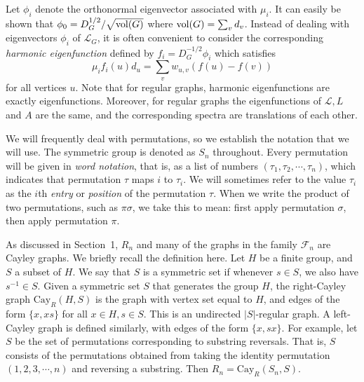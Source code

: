Let $\phi_i$ denote the orthonormal eigenvector associated with $\mu_i$.  It can easily be shown that
$\phi_0 = D_G^{1/2}/\sqrt{{\rm vol}(G)}$ where ${\rm vol}(G)=\sum_v d_v$.
Instead of dealing with eigenvectors $\phi_i$ of $\mathcal{L}_G$, it is often convenient to consider
the corresponding
\textit{harmonic eigenfunction} defined by $f_i = D_G^{-1/2} \phi_i$ which satisfies
\[  \mu_i f_i(u)d_u= \sum_{v} w_{u,v} (f(u)-f(v))  \]
for all vertices $u$.  Note that for regular graphs, 
harmonic eigenfunctions are exactly eigenfunctions.
Moreover, for regular graphs the eigenfunctions of $\mathcal{L}, L$
and $A$ are the same, and the corresponding spectra are translations of each other.




We will frequently deal with permutations, so we establish
the notation that we will use.  The symmetric group is denoted as $S_n$
throughout.  Every permutation will be given in \textit{word notation}, 
that is, as a list of numbers $(\tau_1, \tau_2, \cdots, \tau_n)$, which indicates
that permutation $\tau$ maps $i$ to $\tau_i$.  We will sometimes refer to the 
value $\tau_i$ as the $i$th \textit{entry} or \textit{position} of the permutation $\tau$.
When we write the product
of two permutations, such as $\pi \sigma$, we take this to mean: first apply
permutation $\sigma$, then apply permutation $\pi$.


As discussed in Section~1, $R_n$ and many of the graphs in 
the family $\mathcal{F}_n$ are Cayley
graphs.  We briefly recall the definition here.  Let $H$ be a finite group, and 
$S$ a subset of $H$.  We say that $S$ is a symmetric set if whenever $s \in S$, 
we also have $s^{-1} \in S$.  Given a symmetric set $S$ that generates the 
group $H$, the right-Cayley graph $\text{Cay}_R(H,S)$ is the graph with vertex set
equal to $H$, and edges of the form $\{x, xs\}$ for all $x \in H, s \in S$.
This is an undirected $|S|$-regular graph. A left-Cayley graph is defined similarly,
with edges of the form $\{x,sx\}$.  For example, let $S$ be the set of
permutations corresponding to substring reversals.  That is, $S$ consists of 
the 
permutations obtained from taking the identity permutation 
$(1, 2, 3, \cdots, n)$ and reversing a substring.  Then 
$R_n = \text{Cay}_R(S_n,S)$.

